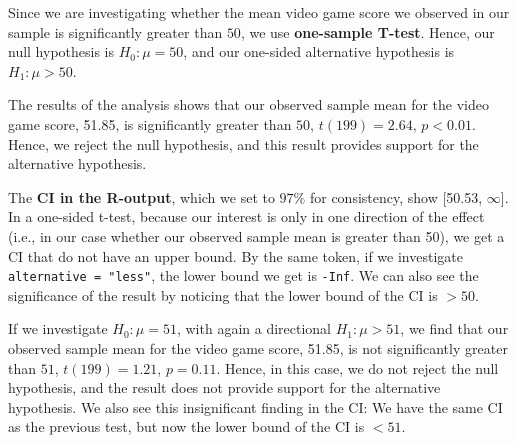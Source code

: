 \documentclass[
]{article}
\newenvironment{Shaded}{\begin{snugshade}}{\end{snugshade}}
\newcommand{\AttributeTok}[1]{\textcolor[rgb]{0.13,0.29,0.53}{#1}}
\newcommand{\DecValTok}[1]{\textcolor[rgb]{0.00,0.00,0.81}{#1}}
\newcommand{\FloatTok}[1]{\textcolor[rgb]{0.00,0.00,0.81}{#1}}
\newcommand{\FunctionTok}[1]{\textcolor[rgb]{0.13,0.29,0.53}{\textbf{#1}}}
\newcommand{\NormalTok}[1]{#1}
\newcommand{\OtherTok}[1]{\textcolor[rgb]{0.56,0.35,0.01}{#1}}
\newcommand{\SpecialCharTok}[1]{\textcolor[rgb]{0.81,0.36,0.00}{\textbf{#1}}}
\newcommand{\StringTok}[1]{\textcolor[rgb]{0.31,0.60,0.02}{#1}}
\begin{document}
Since we are investigating whether the mean video game score we observed
in our sample is significantly greater than \(50\), we use
\textbf{one-sample T-test}. Hence, our null hypothesis is
\(H_0: \mu = 50\), and our one-sided alternative hypothesis is
\(H_1: \mu > 50\).

\begin{Shaded}
\end{Shaded}

The results of the analysis shows that our observed sample mean for the
video game score, 51.85, is significantly greater than \(50\),
\(t(199) = 2.64\), \(p < 0.01\). Hence, we reject the null hypothesis,
and this result provides support for the alternative hypothesis.

The \textbf{CI in the R-output}, which we set to \(97\%\) for
consistency, show {[}50.53, \ensuremath{\infty{}}{]}. In a one-sided
t-test, because our interest is only in one direction of the effect
(i.e., in our case whether our observed sample mean is greater than 50),
we get a CI that do not have an upper bound. By the same token, if we
investigate \texttt{alternative\ =\ "less"}, the lower bound we get is
\texttt{-Inf}. We can also see the significance of the result by
noticing that the lower bound of the CI is \(> 50\).

\begin{Shaded}
\end{Shaded}

If we investigate \(H_0: \mu = 51\), with again a directional
\(H_1: \mu > 51\), we find that our observed sample mean for the video
game score, 51.85, is not significantly greater than \(51\),
\(t(199) = 1.21\), \(p = 0.11\). Hence, in this case, we do not reject
the null hypothesis, and the result does not provide support for the
alternative hypothesis. We also see this insignificant finding in the
CI: We have the same CI as the previous test, but now the lower bound of
the CI is \(< 51\).
\end{document}
